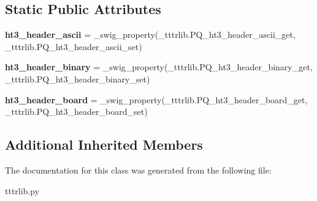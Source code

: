 \subsection*{Static Public Attributes}
\begin{DoxyCompactItemize}
\item 
\mbox{\label{classtttrlib_1_1_p_q_a5f0c64eb0756818817df26a1d26eae24}} 
{\bfseries ht3\+\_\+header\+\_\+ascii} = \+\_\+swig\+\_\+property(\+\_\+tttrlib.\+P\+Q\+\_\+ht3\+\_\+header\+\_\+ascii\+\_\+get, \+\_\+tttrlib.\+P\+Q\+\_\+ht3\+\_\+header\+\_\+ascii\+\_\+set)
\item 
\mbox{\label{classtttrlib_1_1_p_q_a3e94f65df551cef3c9e91cb082380fee}} 
{\bfseries ht3\+\_\+header\+\_\+binary} = \+\_\+swig\+\_\+property(\+\_\+tttrlib.\+P\+Q\+\_\+ht3\+\_\+header\+\_\+binary\+\_\+get, \+\_\+tttrlib.\+P\+Q\+\_\+ht3\+\_\+header\+\_\+binary\+\_\+set)
\item 
\mbox{\label{classtttrlib_1_1_p_q_ab30ba0a46cd58c3a7e72036e2ed96810}} 
{\bfseries ht3\+\_\+header\+\_\+board} = \+\_\+swig\+\_\+property(\+\_\+tttrlib.\+P\+Q\+\_\+ht3\+\_\+header\+\_\+board\+\_\+get, \+\_\+tttrlib.\+P\+Q\+\_\+ht3\+\_\+header\+\_\+board\+\_\+set)
\end{DoxyCompactItemize}
\subsection*{Additional Inherited Members}


The documentation for this class was generated from the following file\+:\begin{DoxyCompactItemize}
\item 
tttrlib.\+py\end{DoxyCompactItemize}

